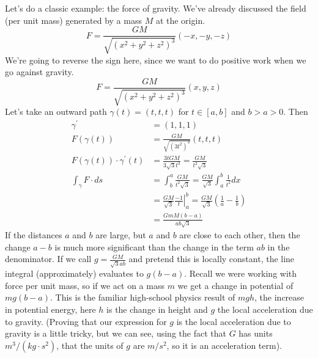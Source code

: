 \documentclass[fleqn,letterpaper]{report}
\begin{document}
\begin{example}
Let's do a classic example: the force of gravity. We've
already discussed the field (per unit mass) generated by a
mass $M$ at the origin.
\begin{equation*}
F = \frac{GM}{\sqrt{(x^2+y^2+z^2)^3}} (-x, -y, -z)
\end{equation*}
We're going to reverse the sign here, since we want to do
positive work when we go against gravity. 
\begin{equation*}
F = \frac{GM}{\sqrt{(x^2+y^2+z^2)^3}} (x, y, z)
\end{equation*}
 Let's take an outward path $\gamma(t) = (t,t,t)$ for $t \in
[a,b]$ and $b>a>0$. Then 
\begin{align*}
\gamma^\prime & = (1,1,1) \\
F(\gamma(t)) & = \frac{GM}{\sqrt{(3t^2)^3}} (t,t,t) \\
F(\gamma(t)) \cdot \gamma^\prime(t) & = \frac{3t GM}{3\sqrt{3}
t^3} = \frac{GM}{t^2\sqrt{3}} \\
\int_{\gamma} F \cdot ds & = \int_b^a
\frac{GM}{t^2\sqrt{3}} = \frac{GM}{\sqrt{3}} \int_a^b
\frac{1}{t^2} dx \\
& = \frac{GM}{\sqrt{3}} \left. \frac{-1}{t} \right|_a^b =
\frac{GM}{\sqrt{3}} \left( \frac{1}{a} - \frac{1}{b} \right) \\
& = \frac{GmM(b-a)}{ab\sqrt{3}}
\end{align*}
If the distances $a$ and $b$ are large, but $a$ and $b$ are
close to each other, then the change $a-b$ is much more
significant than the change in the term $ab$ in the
denominator. If we call $g = \frac{GM}{\sqrt{3}ab}$ and
pretend this is locally constant, the line integral
(approximately) evaluates to $g(b-a)$. Recall we were working
with force per unit mass, so if we act on a mass $m$ we get a
change in potential of $mg(b-a)$. This is the familiar
high-school physics result of $mgh$, the increase in potential
energy, here $h$ is the change in height and $g$ the local
acceleration due to gravity. (Proving that our expression for
$g$ is the local acceleration due to gravity is a little
tricky, but we can see, using the fact that $G$ has units
$m^3/(kg \cdot s^2)$, that the units of $g$ are $m/s^2$, so it
is an acceleration term).
\end{example}
\end{document}
